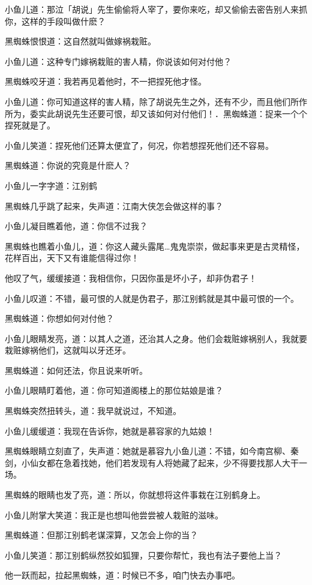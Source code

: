 \documentclass[12pt,oneside]{book}
\begin{document}
小鱼儿道：那泣「胡说」先生偷偷将人宰了，要你来吃，却又偷偷去密告别人来抓你，这样的手段叫做什麽？

黑蜘蛛恨恨道：这自然就叫做嫁祸栽赃。

小鱼儿道：这种专门嫁祸栽赃的害人精，你说该如何对付他？

黑蜘蛛咬牙道：我若再见着他时，不一把捏死他才怪。

小鱼儿道：你可知道这样的害人精，除了胡说先生之外，还有不少，而且他们所作所为，委实此胡说先生还要可恨，却又该如何对付他们！．黑蜘蛛道：捉来一个个捏死就是了。

小鱼儿笑道：捏死他们还算太便宜了，何况，你若想捏死他们还不容易。

黑蜘蛛道：你说的究竟是什麽人？

小鱼儿一字字道：江别鹤

黑蜘蛛几乎跳了起来，失声道：江南大侠怎会做这样的事？

小鱼儿凝目瞧着他，道：你信不过我？

黑蜘蛛也瞧着小鱼儿，道：你这人藏头露尾\ldots 鬼鬼崇崇，做起事来更是古灵精怪，花样百出，天下又有谁能信得过你！

他叹了气，缓缓接道：我相信你，只因你虽是坏小子，却非伪君子！

小鱼儿叹道：不错，最可恨的人就是伪君子，那江别鹤就是其中最可恨的一个。

黑蜘蛛道：你想如何对付他？

小鱼儿眼睛发亮，道：以其人之道，还治其人之身。他们会栽赃嫁祸别人，我就要栽赃嫁祸他们，这就叫以牙还牙。

黑蜘蛛道：如何还法，你且说来听听。

小鱼儿眼睛盯着他，道：你可知道阁楼上的那位姑娘是谁？

黑蜘蛛突然扭转头，道：我早就说过，不知道。

小鱼儿缓缓道：我现在告诉你，她就是慕容家的九姑娘！

黑蜘蛛眼睛立刻直了，失声道：她就是慕容九小鱼儿道：不错，如今南宫柳、秦剑，小仙女都在急着找她，他们若发现有人将她藏了起来，少不得要找那人大干一场。

黑蜘蛛的眼睛也发了亮，道：所以，你就想将这件事栽在江别鹤身上。

小鱼儿附掌大笑道：我正是也想叫他尝尝被人栽赃的滋味。

黑蜘蛛道：但那江别鹤老谋深算，又怎会上你的当？

小鱼儿笑道：那江别鹤纵然狡如狐狸，只要你帮忙，我也有法子要他上当？

他一跃而起，拉起黑蜘蛛，道：时候已不多，咱门快去办事吧。
\end{document}
